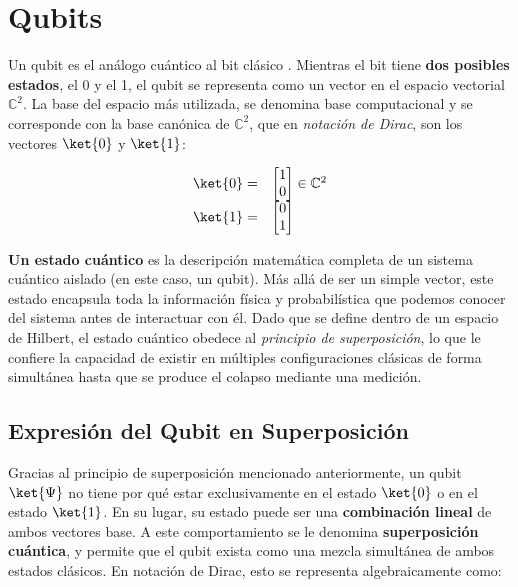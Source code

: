 \chapter{Qubits}
\label{chap:qubits}

Un \gls{qubit} es el análogo cuántico al bit clásico \cite{ionos_qubits_2023}. Mientras el bit tiene \textbf{dos posibles estados}, el 0 y el 1, el \gls{qubit} se representa como un vector en el espacio vectorial $\mathbb{C}^2$. La base del espacio más utilizada, se denomina base computacional y se corresponde con la base canónica de $\mathbb{C}^2$, que en \textit{notación de Dirac}, son los vectores $\ket{0}$ y $\ket{1}$:

\begin{equation*}
    \begin{array}{rl}
        \ket{0} = & \begin{bmatrix}
                        1 \\ 0
                    \end{bmatrix} \in \mathbb{C}^2 \\
        \ket{1} = & \begin{bmatrix}
                        0 \\ 1
                    \end{bmatrix}
    \end{array}
\end{equation*}

\textbf{Un estado cuántico} es la descripción matemática completa de un sistema cuántico aislado (en este caso, un \gls{qubit}). Más allá de ser un simple vector, este estado encapsula toda la información física y probabilística que podemos conocer del sistema antes de interactuar con él. Dado que se define dentro de un espacio de Hilbert, el estado cuántico obedece al \textit{principio de superposición}, lo que le confiere la capacidad de existir en múltiples configuraciones clásicas de forma simultánea hasta que se produce el colapso mediante una medición.

\section{Expresión del Qubit en Superposición}
Gracias al principio de superposición mencionado anteriormente, un qubit $\ket{\Psi}$ no tiene por qué estar exclusivamente en el estado $\ket{0}$ o en el estado $\ket{1}$. En su lugar, su estado puede ser una \textbf{combinación lineal} de ambos vectores base. A este comportamiento se le denomina \textbf{superposición cuántica}, y permite que el qubit exista como una mezcla simultánea de ambos estados clásicos. En notación de Dirac, esto se representa algebraicamente como:

